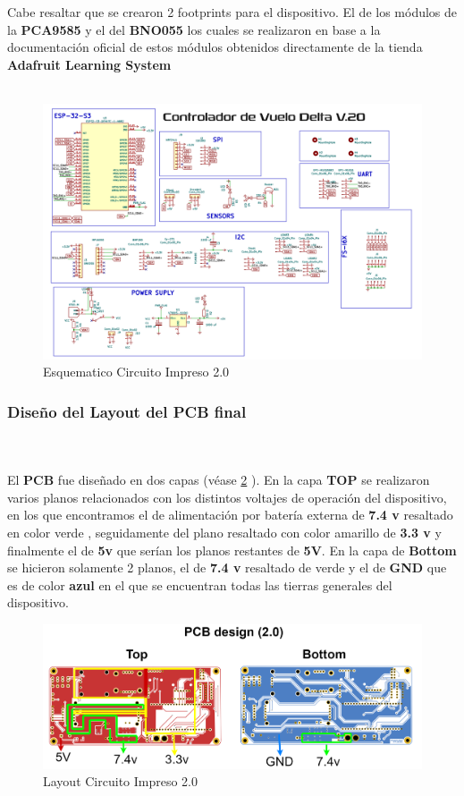 Cabe resaltar que se crearon 2 footprints para el dispositivo. El de los módulos de la \textbf{PCA9585} y el del \textbf{BNO055} los cuales se realizaron en base a la documentación oficial de estos módulos obtenidos directamente de la tienda \textbf{Adafruit Learning System}
\\ \\
\begin{figure}[H]
    \centering
    \includegraphics[width=\textwidth]{Imagenes/Metodologia/SCH2.0.png}
    \caption{Esquematico Circuito Impreso 2.0 }
    \label{fig:sch2.0}
\end{figure}

\subsubsection{Diseño del Layout del PCB final} \\ \\

El \textbf{PCB} fue diseñado en dos capas (véase \ref{fig:pcb_2.0} ). En la capa \textbf{TOP} se realizaron varios planos relacionados  con los distintos voltajes de operación del dispositivo, en los que encontramos el de alimentación por batería externa de \textbf{7.4 v}  resaltado en color verde , seguidamente del plano resaltado con color amarillo de \textbf{3.3 v} y finalmente el de \textbf{5v} que serían los planos restantes de \textbf{5V}. En la capa de \textbf{Bottom} se hicieron solamente 2 planos, el de \textbf{7.4 v} resaltado de verde y el de \textbf{GND} que es de color \textbf{azul} en el que se encuentran todas las tierras generales del dispositivo. \\
\begin{figure}[H]
    \centering
    \includegraphics[width=\textwidth]{Imagenes/Metodologia/PCB20.png}
    \caption{Layout Circuito Impreso 2.0 }
    \label{fig:pcb_2.0}
\end{figure}

